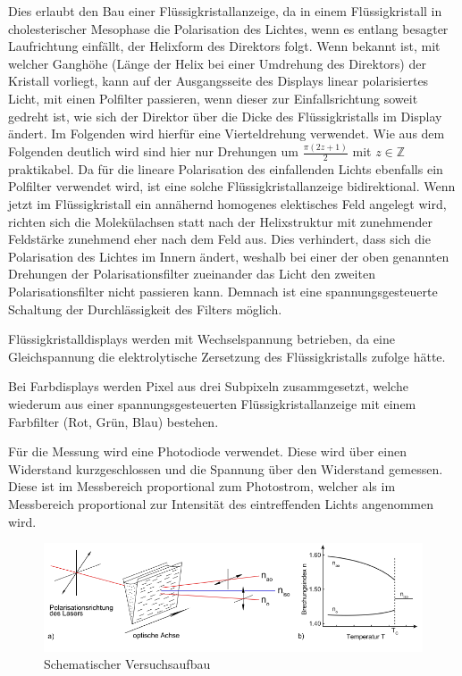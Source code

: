 \documentclass[
	a4paper,
	12pt,
	pagesize,
	ngerman
]{scrartcl}
\begin{document}
	Dies erlaubt den Bau einer Flüssigkristallanzeige, da in einem Flüssigkristall in cholesterischer Mesophase die Polarisation des Lichtes, wenn es entlang besagter Laufrichtung einfällt, der Helixform des Direktors folgt.
	Wenn bekannt ist, mit welcher Ganghöhe (Länge der Helix bei einer Umdrehung des Direktors) der Kristall vorliegt, kann auf der Ausgangsseite des Displays linear polarisiertes Licht, mit einen Polfilter passieren, wenn dieser zur Einfallsrichtung soweit gedreht ist, wie sich der Direktor über die Dicke des Flüssigkristalls im Display ändert.
	Im Folgenden wird hierfür eine Vierteldrehung verwendet. Wie aus dem Folgenden deutlich wird sind hier nur Drehungen um $\frac{\pi (2z+1)}{2}$ mit $z \in \mathbb{Z}$ praktikabel.
	Da für die lineare Polarisation des einfallenden Lichts ebenfalls ein Polfilter verwendet wird, ist eine solche Flüssigkristallanzeige bidirektional.
	Wenn jetzt im Flüssigkristall ein annähernd homogenes elektisches Feld angelegt wird, richten sich die Molekülachsen statt nach der Helixstruktur mit zunehmender Feldstärke zunehmend eher nach dem Feld aus.
	Dies verhindert, dass sich die Polarisation des Lichtes im Innern ändert, weshalb bei einer der oben genannten Drehungen der Polarisationsfilter zueinander das Licht den zweiten Polarisationsfilter nicht passieren kann.
	Demnach ist eine spannungsgesteuerte Schaltung der Durchlässigkeit des Filters möglich.

	Flüssigkristalldisplays werden mit Wechselspannung betrieben, da eine Gleichspannung die elektrolytische Zersetzung des Flüssigkristalls zufolge hätte.

	Bei Farbdisplays werden Pixel aus drei Subpixeln zusammgesetzt, welche wiederum aus einer spannungsgesteuerten Flüssigkristallanzeige mit einem Farbfilter (Rot, Grün, Blau) bestehen.

	\par
	Für die Messung wird eine Photodiode verwendet.
	Diese wird über einen Widerstand kurzgeschlossen und die Spannung über den Widerstand gemessen.
	Diese ist im Messbereich proportional zum Photostrom, welcher als im Messbereich proportional zur Intensität des eintreffenden Lichts angenommen wird.
	\par

	\begin{figure}[H]
			\includegraphics[width=1\linewidth]{images/keil}
			\caption{Schematischer Versuchsaufbau \cite{imp08}
			}
			\label{fig_keil}
	\end{figure}
\end{document}
